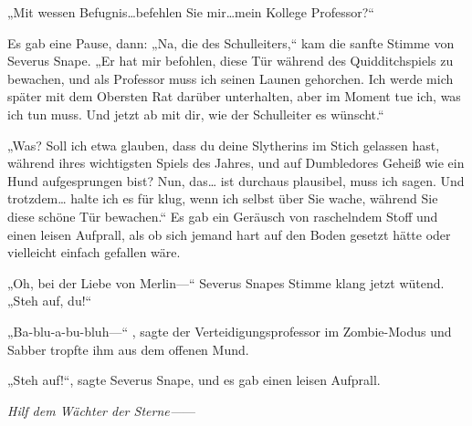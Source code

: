 „Mit wessen Befugnis…befehlen Sie mir…mein Kollege Professor?“

Es gab eine Pause, dann: „Na, die des Schulleiters,“ kam die sanfte Stimme von Severus Snape. „Er hat mir befohlen, diese Tür während des Quidditchspiels zu bewachen, und als Professor muss ich seinen Launen gehorchen. Ich werde mich später mit dem Obersten Rat darüber unterhalten, aber im Moment tue ich, was ich tun muss. Und jetzt ab mit dir, wie der Schulleiter es wünscht.“

„Was? Soll ich etwa glauben, dass du deine Slytherins im Stich gelassen hast, während ihres wichtigsten Spiels des Jahres, und auf Dumbledores Geheiß wie ein Hund aufgesprungen bist? Nun, das… ist durchaus plausibel, muss ich sagen. Und trotzdem… halte ich es für klug, wenn ich selbst über Sie wache, während Sie diese schöne Tür bewachen.“
Es gab ein Geräusch von raschelndem Stoff und einen leisen Aufprall, als ob sich jemand hart auf den Boden gesetzt hätte oder vielleicht einfach gefallen wäre.

„Oh, bei der Liebe von Merlin—“ Severus Snapes Stimme klang jetzt wütend. „Steh auf, du!“

„Ba-blu-a-bu-bluh—“ , sagte der Verteidigungsprofessor im Zombie-Modus und Sabber tropfte ihm aus dem offenen Mund.

„Steh auf!“, sagte Severus Snape, und es gab einen leisen Aufprall.

\emph{Hilf dem Wächter der Sterne—}—

